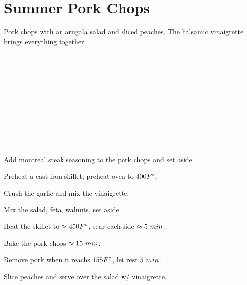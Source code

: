 \section{Summer Pork Chops}


\begin{recipestats}[
	servings=2,
	preptime=15 \minute,
	bakingtime=25 \minute,
	source=Mike \& Jane,
	original=\citeauthor{realSimpleSummerPorkchops}~\cite{realSimpleSummerPorkchops},
]
\end{recipestats}


\begin{recipeabstract}
	Pork chops with an arugala salad and sliced peaches.
	The balsamic vinaigrette brings everything together.
\end{recipeabstract}


\begin{ingredientcolumns}
	\begin{ingredientblock}[vinaigrette]
		\\
		\\
		\\
		\\
		\\
	\end{ingredientblock}

	\begin{ingredientblock}
		\\
		\\
		\\
		\\
	\end{ingredientblock}
\end{ingredientcolumns}


\begin{preparation}
	\item Add montreal steak seasoning to the pork chops and set aside.
	\item Preheat a cast iron skillet; preheat oven to $400 \Fahrenheit$.
	\item Crush the garlic and mix the vinaigrette.
	\item Mix the salad, feta, walnuts, set aside.
	\item Heat the skillet to $\approx 450 \Fahrenheit$, sear each side $\approx 5~\minute$.
	\item Bake the pork chops $\approx 15~\minute$.
	\item Remove pork when it reachs $155 \Fahrenheit$, let rest $5~\minute$.
	\item Slice peaches and serve over the salad w/ vinaigrette.
\end{preparation}


\recipeend%
